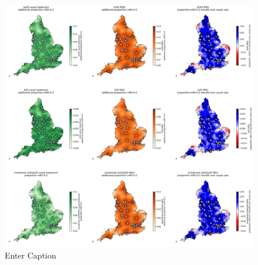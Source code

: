 \begin{figure}
    \centering
    \includegraphics[width=1\linewidth]{images/map_mrs_0_2.jpg}
    \caption{Enter Caption}
    \label{fig:enter-label}
\end{figure}
